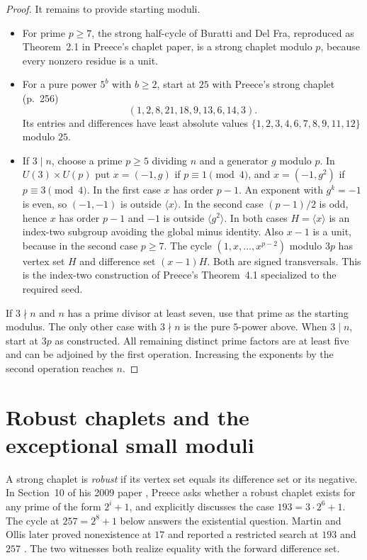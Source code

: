 \documentclass[11pt,a4paper]{article}
\newcommand{\U}{U}
\begin{document}
\begin{proof}
It remains to provide starting moduli.
\begin{itemize}
\item For prime $p\ge7$, the strong half-cycle of Buratti and Del Fra, reproduced as Theorem~2.1 in Preece's chaplet paper, is a strong chaplet modulo $p$, because every nonzero residue is a unit.
\item For a pure power $5^b$ with $b\ge2$, start at $25$ with Preece's strong chaplet (p.~256)
\[
                      (1,2,8,21,18,9,13,6,14,3).
\]
Its entries and differences have least absolute values $\{1,2,3,4,6,7,8,9,11,12\}$ modulo $25$.
\item If $3\mid n$, choose a prime $p\ge5$ dividing $n$ and a generator $g$ modulo $p$. In $\U(3)\times\U(p)$ put $x=(-1,g)$ if $p\equiv1\pmod4$, and $x=(-1,g^2)$ if $p\equiv3\pmod4$. In the first case $x$ has order $p-1$. An exponent with $g^k=-1$ is even, so $(-1,-1)$ is outside $\langle x\rangle$. In the second case $(p-1)/2$ is odd, hence $x$ has order $p-1$ and $-1$ is outside $\langle g^2\rangle$. In both cases $H=\langle x\rangle$ is an index-two subgroup avoiding the global minus identity. Also $x-1$ is a unit, because in the second case $p\ge7$. The cycle $(1,x,\dots,x^{p-2})$ modulo $3p$ has vertex set $H$ and difference set $(x-1)H$. Both are signed transversals. This is the index-two construction of Preece's Theorem~4.1 specialized to the required seed.
\end{itemize}
If $3\nmid n$ and $n$ has a prime divisor at least seven, use that prime as the starting modulus. The only other case with $3\nmid n$ is the pure $5$-power above. When $3\mid n$, start at $3p$ as constructed. All remaining distinct prime factors are at least five and can be adjoined by the first operation. Increasing the exponents by the second operation reaches $n$.
\end{proof}
\section{Robust chaplets and the exceptional small moduli}
\label{sec:robust}
A strong chaplet is \emph{robust} if its vertex set equals its difference set or its negative. In Section~10 of his 2009 paper \cite{chaplet}, Preece asks whether a robust chaplet exists for any prime of the form $2^i+1$, and explicitly discusses the case $193=3\cdot 2^6+1$. The cycle at $257=2^8+1$ below answers the existential question. Martin and Ollis later proved nonexistence at $17$ and reported a restricted search at $193$ and $257$ \cite[Section~6]{mo}. The two witnesses both realize equality with the forward difference set.
\end{document}
